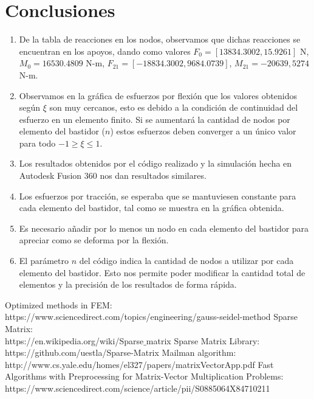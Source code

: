 \documentclass[10pt,a4paper]{article}
\begin{document}
\section*{Conclusiones}
\begin{enumerate}
    \item De la tabla de reacciones en los nodos, observamos que dichas reacciones se encuentran en los apoyos, dando como valores $F_{0} = [13834.3002, 15.9261]$ N, $M_{0} = 16530.4809$ N-m, $F_{21} = [-18834.3002, 9684.0739]$, $M_{21} = -20639,5274$ N-m.
    \item Observamos en la gráfica de esfuerzos por flexión que los valores obtenidos según $\xi$ son muy cercanos, esto es debido a la condición de continuidad del esfuerzo en un elemento finito. Si se aumentará la cantidad de nodos por elemento del bastidor ($n$) estos esfuerzos deben converger a un único valor para todo $-1 \geq \xi \leq 1$.
    \item Los resultados obtenidos por el código realizado y la simulación hecha en Autodesk Fusion 360 nos dan resultados similares.
    \item Los esfuerzos por tracción, se esperaba que se mantuviesen constante para cada elemento del bastidor, tal como se muestra en la gráfica obtenida.
    \item Es necesario añadir por lo menos un nodo en cada elemento del bastidor para apreciar como se deforma por la flexión.
    \item El parámetro $n$ del código indica la cantidad de nodos a utilizar por cada elemento del bastidor. Esto nos permite poder modificar la cantidad total de elementos y la precisión de los resultados de forma rápida. 
\end{enumerate}
\begin{thebibliography}{9}
 Optimized methods in FEM:\\
https://www.sciencedirect.com/topics/engineering/gauss-seidel-method
Sparse Matrix:\\
https://en.wikipedia.org/wiki/Sparse$\_$matrix
Sparse Matrix Library:\\
https://github.com/uestla/Sparse-Matrix
Mailman algorithm:\\
http://www.cs.yale.edu/homes/el327/papers/matrixVectorApp.pdf
Fast Algorithms with Preprocessing for Matrix-Vector Multiplication Problems:\\
https://www.sciencedirect.com/science/article/pii/S0885064X84710211
\end{thebibliography}
%
%

\end{document}
